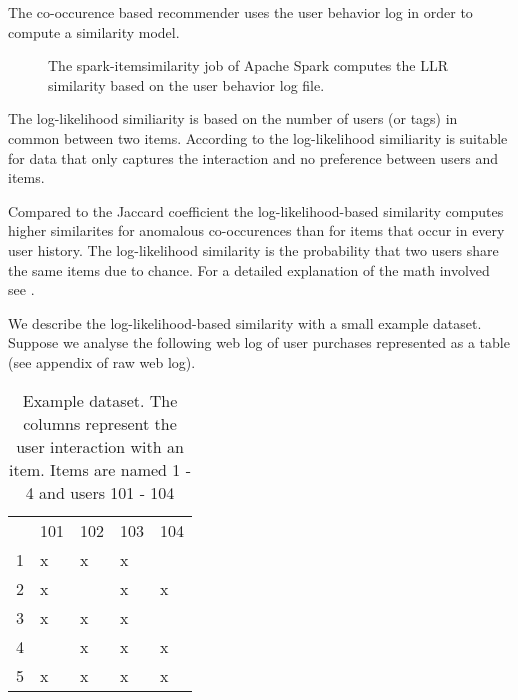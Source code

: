 The co-occurence based recommender uses the user behavior log in order to compute a similarity model. 

\begin{figure}
\centering
{}
\caption{The {\ttfamily spark-itemsimilarity} job of Apache Spark computes the LLR similarity based on the user behavior log file.}
\end{figure}

 The log-likelihood similiarity is based on the number of users (or tags) in common between two items. According to \cite{Dunning93} the log-likelihood similiarity is suitable for data that only captures the interaction and no preference between users and items. 

Compared to the Jaccard coefficient \cite{Hartung} the log-likelihood-based similarity computes higher similarites for anomalous co-occurences than for items that occur in every user history. The log-likelihood similarity  is the probability that two users share the same items due to chance. For a detailed explanation of the math involved see \cite{Dunning93}. 

We describe the log-likelihood-based similarity with a small example dataset. Suppose we analyse the following web log of user purchases represented as a table (see appendix of raw web log).

\begin{table}
\begin{center}
\begin{tabular}{rllll}
 & 101 & 102 & 103 & 104\\
1 & x & x & x & \\
2 & x &  & x & x\\
3 & x & x & x & \\
4 &  & x & x & x\\
5 & x & x & x & x\\
\end{tabular}
\end{center}
\caption{Example dataset. The columns represent the user interaction with an item. Items are named 1 - 4 and users 101 - 104}
\label{tbl:llr}
\end{table}

